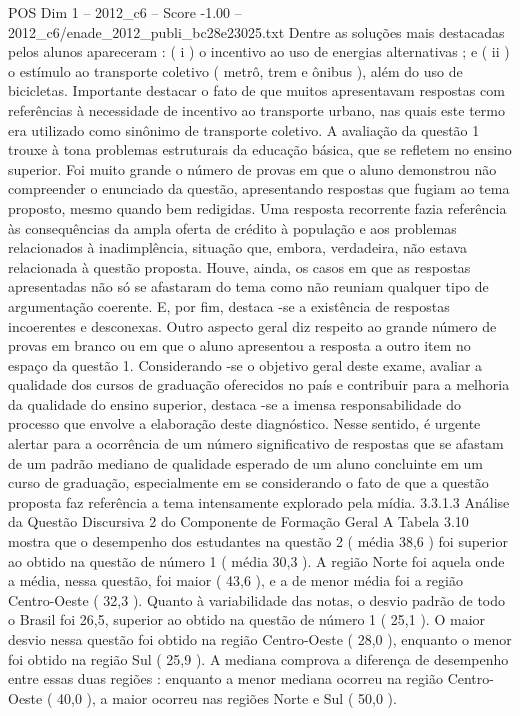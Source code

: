 \begin{textsample}{POS Dim 1 – 2012\_c6 – Score -1.00 – 2012\_c6/enade\_2012\_publi\_bc28e23025.txt}
Dentre as soluções mais destacadas pelos alunos apareceram : ( i ) o incentivo ao uso de energias alternativas ; e ( ii ) o estímulo ao transporte coletivo ( metrô, trem e ônibus ), além do uso de bicicletas.
Importante destacar o fato de que muitos apresentavam respostas com referências à necessidade de incentivo ao transporte urbano, nas quais este termo era utilizado como sinônimo de transporte coletivo.
A avaliação da questão 1 trouxe à tona problemas estruturais da educação básica, que se refletem no ensino superior.
Foi muito grande o número de provas em que o aluno demonstrou não compreender o enunciado da questão, apresentando respostas que fugiam ao tema proposto, mesmo quando bem redigidas.
Uma resposta recorrente fazia referência às consequências da ampla oferta de crédito à população e aos problemas relacionados à inadimplência, situação que, embora, verdadeira, não estava relacionada à questão proposta.
Houve, ainda, os casos em que as respostas apresentadas não só se afastaram do tema como não reuniam qualquer tipo de argumentação coerente.
E, por fim, destaca -se a existência de respostas incoerentes e desconexas.
Outro aspecto geral diz respeito ao grande número de provas em branco ou em que o aluno apresentou a resposta a outro item no espaço da questão 1.
Considerando -se o objetivo geral deste exame, avaliar a qualidade dos cursos de graduação oferecidos no país e contribuir para a melhoria da qualidade do ensino superior, destaca -se a imensa responsabilidade do processo que envolve a elaboração deste diagnóstico.
Nesse sentido, é urgente alertar para a ocorrência de um número significativo de respostas que se afastam de um padrão mediano de qualidade esperado de um aluno concluinte em um curso de graduação, especialmente em se considerando o fato de que a questão proposta faz referência a tema intensamente explorado pela mídia. 3.3.1.3 Análise da Questão Discursiva 2 do Componente de Formação Geral A Tabela 3.10 mostra que o desempenho dos estudantes na questão 2 ( média 38,6 ) foi superior ao obtido na questão de número 1 ( média 30,3 ).
A região Norte foi aquela onde a média, nessa questão, foi maior ( 43,6 ), e a de menor média foi a região Centro-Oeste ( 32,3 ).
Quanto à variabilidade das notas, o desvio padrão de todo o Brasil foi 26,5, superior ao obtido na questão de número 1 ( 25,1 ).
O maior desvio nessa questão foi obtido na região Centro-Oeste ( 28,0 ), enquanto o menor foi obtido na região Sul ( 25,9 ).
A mediana comprova a diferença de desempenho entre essas duas regiões : enquanto a menor mediana ocorreu na região Centro-Oeste ( 40,0 ), a maior ocorreu nas regiões Norte e Sul ( 50,0 ).

\end{textsample}
